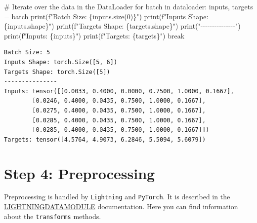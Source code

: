 \documentclass[
  letterpaper,
  DIV=11,
  numbers=noendperiod]{scrreprt}
\newenvironment{Shaded}{\begin{snugshade}}{\end{snugshade}}
\newcommand{\BuiltInTok}[1]{\textcolor[rgb]{0.00,0.23,0.31}{#1}}
\newcommand{\CommentTok}[1]{\textcolor[rgb]{0.37,0.37,0.37}{#1}}
\newcommand{\ControlFlowTok}[1]{\textcolor[rgb]{0.00,0.23,0.31}{#1}}
\newcommand{\DecValTok}[1]{\textcolor[rgb]{0.68,0.00,0.00}{#1}}
\newcommand{\KeywordTok}[1]{\textcolor[rgb]{0.00,0.23,0.31}{#1}}
\newcommand{\NormalTok}[1]{\textcolor[rgb]{0.00,0.23,0.31}{#1}}
\newcommand{\OperatorTok}[1]{\textcolor[rgb]{0.37,0.37,0.37}{#1}}
\newcommand{\SpecialCharTok}[1]{\textcolor[rgb]{0.37,0.37,0.37}{#1}}
\newcommand{\SpecialStringTok}[1]{\textcolor[rgb]{0.13,0.47,0.30}{#1}}
\newcommand{\StringTok}[1]{\textcolor[rgb]{0.13,0.47,0.30}{#1}}
\begin{document}
\begin{tcolorbox}
\begin{Shaded}
\begin{Highlighting}[]
\CommentTok{\# Iterate over the data in the DataLoader}
\ControlFlowTok{for}\NormalTok{ batch }\KeywordTok{in}\NormalTok{ dataloader:}
\NormalTok{    inputs, targets }\OperatorTok{=}\NormalTok{ batch}
    \BuiltInTok{print}\NormalTok{(}\SpecialStringTok{f"Batch Size: }\SpecialCharTok{\{}\NormalTok{inputs}\SpecialCharTok{.}\NormalTok{size(}\DecValTok{0}\NormalTok{)}\SpecialCharTok{\}}\SpecialStringTok{"}\NormalTok{)}
    \BuiltInTok{print}\NormalTok{(}\SpecialStringTok{f"Inputs Shape: }\SpecialCharTok{\{}\NormalTok{inputs}\SpecialCharTok{.}\NormalTok{shape}\SpecialCharTok{\}}\SpecialStringTok{"}\NormalTok{)}
    \BuiltInTok{print}\NormalTok{(}\SpecialStringTok{f"Targets Shape: }\SpecialCharTok{\{}\NormalTok{targets}\SpecialCharTok{.}\NormalTok{shape}\SpecialCharTok{\}}\SpecialStringTok{"}\NormalTok{)}
    \BuiltInTok{print}\NormalTok{(}\StringTok{"{-}{-}{-}{-}{-}{-}{-}{-}{-}{-}{-}{-}{-}{-}{-}"}\NormalTok{)}
    \BuiltInTok{print}\NormalTok{(}\SpecialStringTok{f"Inputs: }\SpecialCharTok{\{}\NormalTok{inputs}\SpecialCharTok{\}}\SpecialStringTok{"}\NormalTok{)}
    \BuiltInTok{print}\NormalTok{(}\SpecialStringTok{f"Targets: }\SpecialCharTok{\{}\NormalTok{targets}\SpecialCharTok{\}}\SpecialStringTok{"}\NormalTok{)}
    \ControlFlowTok{break}
\end{Highlighting}
\end{Shaded}

\begin{verbatim}
Batch Size: 5
Inputs Shape: torch.Size([5, 6])
Targets Shape: torch.Size([5])
---------------
Inputs: tensor([[0.0033, 0.4000, 0.0000, 0.7500, 1.0000, 0.1667],
        [0.0246, 0.4000, 0.0435, 0.7500, 1.0000, 0.1667],
        [0.0275, 0.4000, 0.0435, 0.7500, 1.0000, 0.1667],
        [0.0285, 0.4000, 0.0435, 0.7500, 1.0000, 0.1667],
        [0.0285, 0.4000, 0.0435, 0.7500, 1.0000, 0.1667]])
Targets: tensor([4.5764, 4.9073, 6.2846, 5.5094, 5.6079])
\end{verbatim}

\end{tcolorbox}

\section{Step 4: Preprocessing}\label{sec-preprocessing-33}

Preprocessing is handled by \texttt{Lightning} and \texttt{PyTorch}. It
is described in the
\href{https://lightning.ai/docs/pytorch/stable/data/datamodule.html}{LIGHTNINGDATAMODULE}
documentation. Here you can find information about the
\texttt{transforms} methods.
\end{document}

